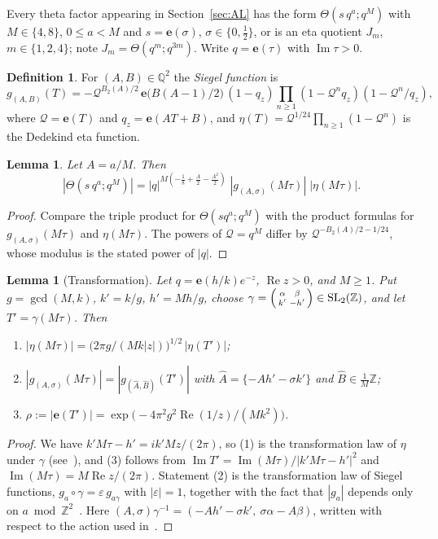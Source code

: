 \documentclass[11pt]{amsart}
\newtheorem{lemma}[theorem]{Lemma}
\theoremstyle{definition}
\newtheorem{definition}[theorem]{Definition}
\theoremstyle{remark}
\numberwithin{equation}{section}
\newcommand{\e}{\mathbf{e}}
\newcommand{\Z}{\mathbb{Z}}
\newcommand{\Q}{\mathbb{Q}}
\newcommand{\re}{\operatorname{Re}}
\newcommand{\im}{\operatorname{Im}}
\newcommand{\SL}{\mathrm{SL}_2(\Z)}
\newcommand{\Ahat}{\widehat{A}}
\newcommand{\Bhat}{\widehat{B}}
\newcommand{\fr}[1]{\{#1\}}
\begin{document}
Every theta factor appearing in Section~\ref{sec:AL} has the form $\Theta(s\,q^a;q^M)$ with $M\in\{4,8\}$, $0\le a<M$ and $s=\e(\sigma)$, $\sigma\in\{0,\frac12\}$, or is an eta quotient $J_m$, $m\in\{1,2,4\}$; note $J_m=\Theta(q^m;q^{3m})$.
Write $q=\e(\tau)$ with $\im\tau>0$.

\begin{definition}
For $(A,B)\in\Q^2$ the \emph{Siegel function} is
\[
g_{(A,B)}(T)=-\mathcal Q^{B_2(A)/2}\,\e\big(B(A-1)/2\big)\,(1-q_z)\prod_{n\ge1}(1-\mathcal Q^nq_z)(1-\mathcal Q^n/q_z),
\]
where $\mathcal Q=\e(T)$ and $q_z=\e(AT+B)$,
and $\eta(T)=\mathcal Q^{1/24}\prod_{n\ge1}(1-\mathcal Q^n)$ is the Dedekind eta function.
\end{definition}

\begin{lemma}\label{lem:siegel}
Let $A=a/M$. Then
\[
|\Theta(s\,q^a;q^M)|=|q|^{M(-\frac18+\frac A2-\frac{A^2}2)}\;|g_{(A,\sigma)}(M\tau)|\;|\eta(M\tau)|.
\]
\end{lemma}

\begin{proof}
Compare the triple product for $\Theta(sq^a;q^M)$ with the product formulas for $g_{(A,\sigma)}(M\tau)$ and $\eta(M\tau)$.
The powers of $\mathcal Q=q^M$ differ by $\mathcal Q^{-B_2(A)/2-1/24}$, whose modulus is the stated power of $|q|$.
\end{proof}

\begin{lemma}[Transformation]\label{lem:transf}
Let $q=\e(h/k)e^{-z}$, $\re z>0$, and $M\ge1$.
Put $g=\gcd(M,k)$, $k'=k/g$, $h'=Mh/g$, choose $\gamma=\begin{psmallmatrix}\alpha&\beta\\ k'&-h'\end{psmallmatrix}\in\SL$, and let $T'=\gamma(M\tau)$.
Then
\begin{enumerate}
\item $|\eta(M\tau)|=\big(2\pi g/(Mk|z|)\big)^{1/2}\,|\eta(T')|$;
\item $|g_{(A,\sigma)}(M\tau)|=|g_{(\Ahat,\Bhat)}(T')|$ with $\Ahat=\fr{-Ah'-\sigma k'}$ and $\Bhat\in\frac1M\Z$;
\item $\rho:=|\e(T')|=\exp\!\big(-4\pi^2g^2\re(1/z)/(Mk^2)\big)$.
\end{enumerate}
\end{lemma}

\begin{proof}
We have $k'M\tau-h'=ik'Mz/(2\pi)$, so (1) is the transformation law of $\eta$ under $\gamma$ (see~\cite[Thm.~3.4]{Ap}), and (3) follows from $\im T'=\im(M\tau)/|k'M\tau-h'|^2$ and $\im(M\tau)=M\re z/(2\pi)$.
Statement (2) is the transformation law of Siegel functions, $g_{a}\circ\gamma=\varepsilon\, g_{a\gamma}$ with $|\varepsilon|=1$, together with the fact that $|g_a|$ depends only on $a\bmod\Z^2$~\cite[Ch.~2, K1--K2]{KL}.
Here $(A,\sigma)\gamma^{-1}=(-Ah'-\sigma k',\ \sigma\alpha-A\beta)$, written with respect to the action used in~\cite{KL}.
\end{proof}
\end{document}
